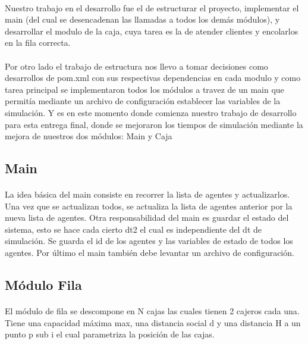 \documentclass{article}
\begin{document}
\paragraph{}
Nuestro trabajo en el desarrollo fue el de estructurar el proyecto, implementar el main (del cual se desencadenan las llamadas a todos los demás módulos),  y desarrollar el modulo de la caja, cuya tarea es la  de atender clientes y encolarlos en la fila correcta.

\paragraph{}
Por otro lado el trabajo de estructura nos llevo a tomar decisiones como desarrollos de pom.xml con sus respectivas dependencias en cada modulo y como tarea principal se implementaron todos los módulos a travez de un main que permitía mediante un archivo de configuración establecer las variables de la simulación. Y es en este momento donde comienza nuestro trabajo de desarrollo para esta entrega final, donde se mejoraron los tiempos de simulación mediante la mejora de nuestros dos módulos: Main y Caja

\subsection{Main}

\paragraph{}
La idea básica del main consiste en recorrer la lista de agentes y actualizarlos. Una vez que se actualizan todos, se actualiza la lista de agentes anterior por la nueva lista de agentes. Otra responsabilidad del main es guardar el estado del sistema, esto se hace
cada cierto dt2 el cual es independiente del dt de simulación. Se guarda el id de los agentes y las variables de estado de todos los agentes. Por último el main también debe levantar un archivo de configuración.

\subsection{Módulo Fila}

\paragraph{}
El módulo de fila se descompone en N cajas las cuales tienen 2 cajeros cada una. Tiene una capacidad máxima max, una distancia social d y una distancia H a un punto p sub i el cual parametriza la posición de las cajas.
\end{document}
